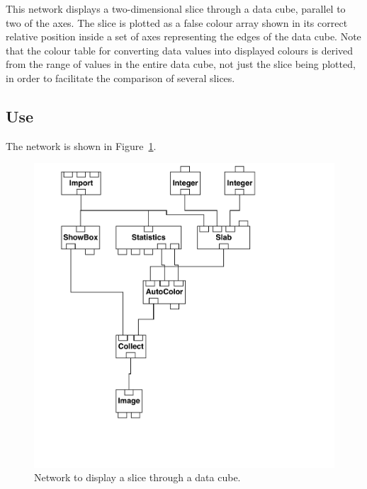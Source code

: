 \documentclass[twoside,11pt]{starlink}
\begin{document}
This network displays a two-dimensional slice through a data cube,
parallel to two of the axes. The slice is plotted as a false colour
array shown in its correct relative position inside a set of axes
representing the edges of the data cube. Note that the colour table for
converting data values into displayed colours is derived from the range
of values in the entire data cube, not just the slice being plotted,
in order to facilitate the comparison of several slices.

\subsection{Use}

The network is shown in Figure~\ref{SLICNETF}.

\begin{figure}[htbp]

\begin{center}
\leavevmode
\includegraphics[width=553pt]{sc2_slice}
\end{center}

\caption[Network to display a slice through a data cube.]{Network to
display a slice through a data cube. \label{SLICNETF} }

\end{figure}
\end{document}
